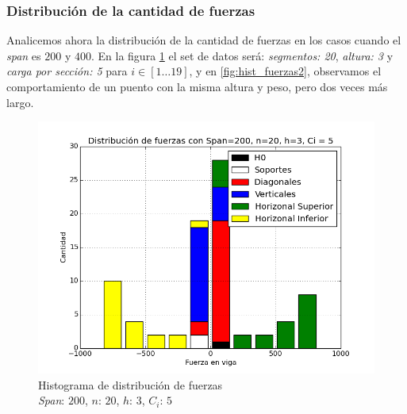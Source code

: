 \subsubsection{Distribución de la cantidad de fuerzas}

Analicemos ahora la distribución de la cantidad de fuerzas en los casos cuando el \textit{span} es $200$ y $400$. En la figura \ref{fig:hist_fuerzas} el set de datos será: \textit{segmentos: 20}, \textit{altura: 3} y \textit{carga por sección: 5} para $i \in [1 \dots 19]$, y en \ref{fig:hist_fuerzas2}, observamos el comportamiento de un puento con la misma altura y peso, pero dos veces más largo.

\begin{figure}[h!]
\begin{center}
\includegraphics[scale=0.5]{archivos/graficos/hist_200.png}
\caption{\label{fig:hist_fuerzas}Histograma de distribución de fuerzas\\
\textit{Span}: $200$, $n$: $20$, $h$: $3$, $C_i$: $5$}
\end{center}
\end{figure}

